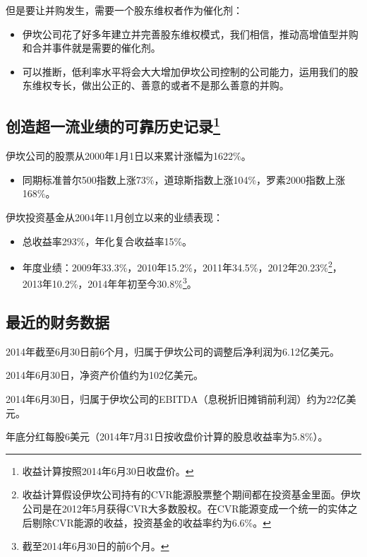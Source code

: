 但是要让并购发生，需要一个股东维权者作为催化剂：

\begin{itemize}
\item 伊坎公司花了好多年建立并完善股东维权模式，我们相信，推动高增值型并购和合并事件就是需要的催化剂。
\item 可以推断，低利率水平将会大大增加伊坎公司控制的公司能力，运用我们的股东维权专长，做出公正的、善意的或者不是那么善意的并购。
\end{itemize}

\subsection[创造超一流业绩的可靠历史记录]{创造超一流业绩的可靠历史记录\footnote{\label{fn:pdf-32-2}收益计算按照2014年6月30日收盘价。}}

伊坎公司的股票从2000年1月1日以来累计涨幅为1622\%。

\begin{itemize}
\item 同期标准普尔500指数上涨73\%，道琼斯指数上涨104\%，罗素2000指数上涨168\%。
\end{itemize}

伊坎投资基金从2004年11月创立以来的业绩表现：

\begin{itemize}
\item 总收益率293\%，年化复合收益率15\%。
\item 年度业绩：2009年33.3\%，2010年15.2\%，2011年34.5\%，2012年20.23\%\footnote{\label{fn:pdf-32-3}收益计算假设伊坎公司持有的CVR能源股票整个期间都在投资基金里面。伊坎公司是在2012年5月获得CVR大多数股权。在CVR能源变成一个统一的实体之后剔除CVR能源的收益，投资基金的收益率约为6.6\%。}，2013年10.2\%，2014年年初至今30.8\%\footnote{\label{fn:pdf-32-4}截至2014年6月30日的前6个月。}。
\end{itemize}

\subsection{最近的财务数据}

2014年截至6月30日前6个月，归属于伊坎公司的调整后净利润为6.12亿美元。

2014年6月30日，净资产价值约为102亿美元。

2014年6月30日，归属于伊坎公司的EBITDA（息税折旧摊销前利润）约为22亿美元。

年底分红每股6美元（2014年7月31日按收盘价计算的股息收益率为5.8\%）。

